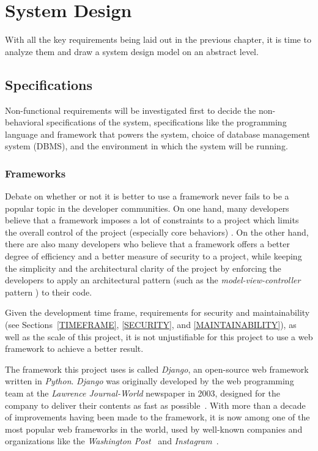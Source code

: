 

\chapter{System Design}
\label{chap:SYSDES}

With all the key requirements being laid out in the previous chapter, it is
time to analyze them and draw a system design model on an abstract
level. 

\section{Specifications}
Non-functional requirements will be investigated first to decide the
non-behavioral specifications of the system, specifications like the
programming language and framework that powers the system, choice of database
management system (DBMS),
and the environment in which the system will be running.

\subsection{Frameworks}
Debate on whether or not it is better to use a framework never fails to be
a popular topic in the developer communities. On one hand, many developers
believe that a framework imposes a lot of constraints to a project which limits the
overall control of the project (especially core behaviors) \cite{frameworks}.
On the other hand, there are also many developers who believe that a framework
offers a better degree of efficiency and a better
measure of security to a project, while keeping the simplicity and
the architectural clarity of the project by enforcing the developers to apply
an architectural pattern (such as the \emph{model-view-controller} pattern
\cite{mvc}) to their code.

\medskip

Given the development time frame, requirements for
security and maintainability (see Sections~\ref{TIMEFRAME},
\ref{SECURITY}, and \ref{MAINTAINABILITY}),
as well as the scale of this project,
it is not unjustifiable for this project to use a web framework to achieve a
better result.

\medskip

The framework this project uses is called \emph{Django}, an open-source web
framework written in \emph{Python}. \emph{Django} was originally developed by
the web programming team at the \emph{Lawrence Journal-World} newspaper in 2003,
designed for the company to deliver their contents as fast as possible~\cite{django}.
With more than a decade of improvements
having been made to the framework, it is now among one of the most popular web
frameworks in the world, used by well-known companies and organizations like the
\emph{Washington Post}~\cite{djangoWashingtonPost}
and \emph{Instagram}~\cite{djangoInstagram}.
\medskip

